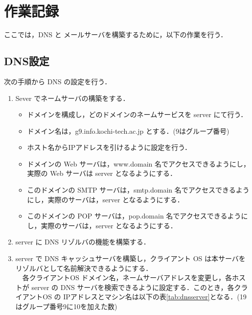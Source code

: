 \documentclass[a4j,titlepage]{jarticle}
\begin{document}
\newpage
\section{作業記録}
ここでは，DNS と メールサーバを構築するために，以下の作業を行う．

\subsection{DNS設定}
次の手順から DNS の設定を行う．
\begin{enumerate}
\item Sever でネームサーバの構築をする．
  \begin{itemize}
  \item ドメインを構成し，どのドメインのネームサービスを server にて行う．

  \item ドメイン名は，g9.info.kochi-tech.ac.jp とする．(9はグループ番号)

  \item ホスト名からIPアドレスを引けるように設定を行う．

  \item ドメインの Web サーバは，www.domain 名でアクセスできるようにし，実際の Web サーバは server となるようにする．

  \item このドメインの SMTP サーバは，smtp.domain 名でアクセスできるようにし，実際のサーバは，server となるようにする．

  \item このドメインの POP サーバは，pop.domain 名でアクセスできるようにし，実際のサーバは，server となるようにする．
  \end{itemize}

\item server に DNS リゾルバの機能を構築する．

\item server で DNS キャッシュサーバを構築し，クライアント OS は本サーバをリゾルバとして名前解決できるようにする．\\
  　各クライアントOS ドメイン名，ネームサーバアドレスを変更し，各ホストが server の DNS サーバを検索できるように設定する．このとき，各クライアントOS の IPアドレスとマシン名は以下の表\ref{tab:dnsserver}となる．(19はグループ番号9に10を加えた数)


\end{enumerate}
\end{document}
